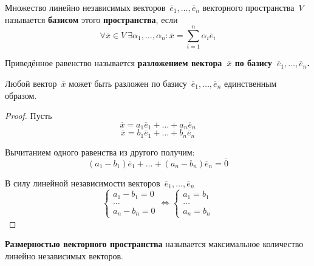  Множество линейно независимых векторов~$\overline e_1, \ldots, \overline e_n$ векторного пространства~$V$ называется \textbf{базисом} этого \textbf{пространства}, если
\begin{equation*}
\forall \overline x \in V \
\exists \alpha_1, \ldots, \alpha_n \colon
\overline x = \sum_{i=1}^n \alpha_i \overline e_i
\end{equation*}

Приведённое равенство называется \textbf{разложением вектора~$\overline x$ по базису~$\overline e_1, \ldots, \overline e_n$.}

\begin{theorem}
Любой вектор~$\overline x$ может быть разложен по базису~$\overline e_1, \ldots, \overline e_n$ единственным образом.
\end{theorem}
\begin{proof}
Пусть
\begin{equation*}
\overline x = a_1 \overline e_1 + \ldots + a_n \overline e_n
\end{equation*}
\begin{equation*}
\overline x = b_1 \overline e_1 + \ldots + b_n \overline e_n
\end{equation*}

Вычитанием одного равенства из другого получим:
\begin{equation*}
(a_1 - b_1) \overline e_1 + \ldots + (a_n - b_n) \overline e_n = \overline 0
\end{equation*}

В силу линейной независимости векторов~$\overline e_1, \ldots, \overline e_n$
\begin{equation*}
\begin{cases}
a_1 - b_1 = 0 \\
\ldots \\
a_n - b_n = 0
\end{cases}
\Leftrightarrow
\begin{cases}
a_1 = b_1 \\
\ldots \\
a_n = b_n
\end{cases}
\end{equation*}
\end{proof}

\textbf{Размерностью векторного пространства} называется максимальное количество линейно независимых векторов.

